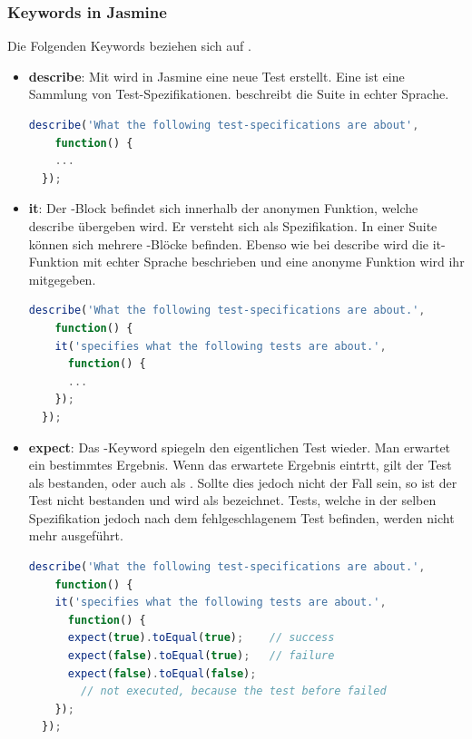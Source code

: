 \subsubsection{Keywords in Jasmine}
Die Folgenden Keywords beziehen sich auf \cite[5-8]{Hahn:2013}.
\begin{itemize}
  \item \textbf{describe}:\newline
        Mit  wird in Jasmine eine neue Test  erstellt. Eine  ist eine Sammlung von Test-Spezifikationen.  beschreibt die Suite in echter Sprache.
\begin{lstlisting}[language=JavaScript]
  describe('What the following test-specifications are about', 
    function() {
    ...
  });
\end{lstlisting}
  \item \textbf{it}:\newline
        Der -Block befindet sich innerhalb der anonymen Funktion, welche describe übergeben wird. Er versteht sich als Spezifikation. In einer Suite können sich mehrere -Blöcke befinden. Ebenso wie bei describe wird die it-Funktion mit echter Sprache beschrieben und eine anonyme Funktion wird ihr mitgegeben.
\begin{lstlisting}[language=JavaScript]
  describe('What the following test-specifications are about.', 
    function() {
    it('specifies what the following tests are about.', 
      function() {
      ...
    });
  });
\end{lstlisting}
  \item \textbf{expect}:\newline
        Das -Keyword spiegeln den eigentlichen Test wieder. Man erwartet ein bestimmtes Ergebnis. Wenn das erwartete Ergebnis eintrtt, gilt der Test als bestanden, oder auch als . Sollte dies jedoch nicht der Fall sein, so ist der Test nicht bestanden und wird als  bezeichnet. Tests, welche in der selben Spezifikation jedoch nach dem fehlgeschlagenem Test befinden, werden nicht mehr ausgeführt.
\begin{lstlisting}[language=JavaScript]
  describe('What the following test-specifications are about.', 
    function() {
    it('specifies what the following tests are about.', 
      function() {
      expect(true).toEqual(true);    // success
      expect(false).toEqual(true);   // failure
      expect(false).toEqual(false);  
        // not executed, because the test before failed
    });
  });
\end{lstlisting}
\end{itemize}

